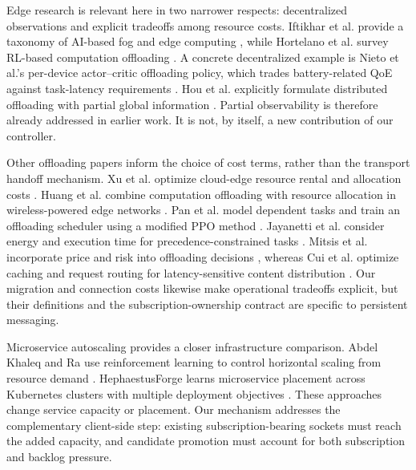 Edge research is relevant here in two narrower respects: decentralized
observations and explicit tradeoffs among resource costs. Iftikhar et al.
provide a taxonomy of AI-based fog and edge computing \cite{Iftikhar2023EdgeAI},
while Hortelano et al. survey RL-based computation offloading
\cite{Hortelano2023RLOffloading}. A concrete decentralized example is Nieto
et al.'s per-device actor--critic offloading policy, which trades battery-related
QoE against task-latency requirements \cite{Nieto2024DRLOffloading}. Hou et al.
explicitly formulate distributed offloading with partial global information
\cite{Hou2023PODRL}. Partial observability is therefore already addressed in
earlier work. It is not, by itself, a new contribution of our controller.

Other offloading papers inform the choice of cost terms, rather than the
transport handoff mechanism. Xu et al. optimize cloud-edge resource rental and
allocation costs \cite{Xu2022CloudEdgeResource}. Huang et al. combine
computation offloading with resource allocation in wireless-powered edge
networks \cite{Huang2020Offloading}. Pan et al. model dependent tasks and train
an offloading scheduler using a modified PPO method \cite{Pan2023ICNOffloading}.
Jayanetti et al. consider energy and execution time for precedence-constrained
tasks \cite{Jayanetti2022EdgeCloudScheduling}. Mitsis et al. incorporate price
and risk into offloading decisions \cite{Mitsis2022RiskOffloading}, whereas Cui
et al. optimize caching and request routing for latency-sensitive content
distribution \cite{Cui2023IoTEdgeCloud}. Our migration and connection costs
likewise make operational tradeoffs explicit, but their definitions and the
subscription-ownership contract are specific to persistent messaging.

Microservice autoscaling provides a closer infrastructure comparison.
Abdel Khaleq and Ra use reinforcement learning to control horizontal scaling
from resource demand \cite{AbdelKhaleq2021Autoscaling}. HephaestusForge learns
microservice placement across Kubernetes clusters with multiple deployment
objectives \cite{Santos2025HephaestusForge}. These approaches change service
capacity or placement. Our mechanism addresses the complementary client-side
step: existing subscription-bearing sockets must reach the added capacity,
and candidate promotion must account for both subscription and backlog pressure.

